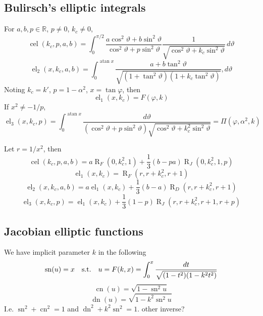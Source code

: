 \documentclass[10pt,dvipdfmx,letterpaper,twoside]{article}
\DeclareMathOperator{\atan}{atan}
\let\O=\operatorname
\newcommand{\RR}{{\mathbb{R}}}
\let\al=\alpha
\let\theta=\vartheta
\let\phi=\varphi
\begin{document}
\subsection{Bulirsch's elliptic integrals}
For $a,b,p\in\RR$, $p\neq0$, $k_c\neq0$,
\[ \O{cel}(k_c,p,a,b) = \int_0^{\pi/2} \frac{a \cos^2\theta + b\sin^2\theta}{\cos^2\theta + p\sin^2\theta} \frac{1}{\sqrt{\cos^2\theta+k_c\sin^2\theta}}\,d\theta \]
\[ \O{el}_2(x,k_c,a,b) = \int_0^{\atan x} \frac{a+b\tan^2\theta}{\sqrt{(1+\tan^2\theta)(1+k_c\tan^2\theta)}},d\theta \]
Noting $k_c=k'$, $p=1-\al^2$, $x=\tan\phi$, then
\[ \O{el}_1(x,k_c) = F(\phi,k) \]
If $x^2\neq-1/p$,
\[ \O{el}_3(x,k_c,p) = \int_0^{\atan x}\frac{d\theta}{(\cos^2\theta+p\sin^2\theta)\sqrt{\cos^2\theta+k_c^2\sin^2\theta}} = \Pi(\phi, \al^2, k) \]

Let $r=1/x^2$, then
\[ \O{cel}(k_c,p,a,b) = a \O{R}_F(0,k_c^2,1) + \frac13(b-p a)\O{R}_J(0,k_c^2,1,p) \]
\[ \O{el}_1(x,k_c) = \O{R}_F(r, r+k_c^2, r+1) \]
\[ \O{el}_2(x,k_c,a,b) = a \O{el}_1(x,k_c) + \frac13(b-a)\O{R}_D(r,r+k_c^2,r+1) \]
\[ \O{el}_3(x,k_c,p) = \O{el}_1(x,k_c) + \frac13(1-p)\O{R}_J(r,r+k_c^2,r+1,r+p) \]

\subsection{Jacobian elliptic functions}
We have implicit parameter $k$ in the following
\[ \O{sn}(u) = x \text{\quad s.t.\quad} u = F(k,x) = \int_0^x \frac{dt}{\sqrt{(1-t^2)(1-k^2t^2)}} \]
\[ \O{cn}(u) = \sqrt{1-\O{sn}^2 u} \]
\[ \O{dn}(u) = \sqrt{1-k^2\O{sn}^2 u} \]
I.e. $\O{sn}^2 + \O{cn}^2 = 1$ and $\O{dn}^2 + k^2\O{sn}^2 = 1$.
other inverse?
\end{document}
